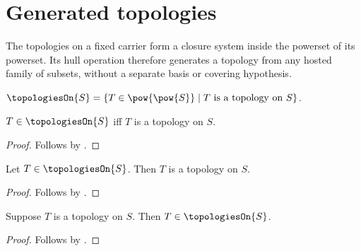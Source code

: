 \section{Generated topologies}




The topologies on a fixed carrier form a closure system inside the powerset
of its powerset.  Its hull operation therefore generates a topology from any
hosted family of subsets, without a separate basis or covering hypothesis.

\begin{definition}\label{topologies_on}
    $\topologiesOn{S}=\{T\in\pow{\pow{S}}\mid
        \text{$T$ is a topology on $S$}\}$.
\end{definition}

\begin{proposition}\label{topologies_on_iff}
    $T\in\topologiesOn{S}$ iff $T$ is a topology on $S$.
\end{proposition}
\begin{proof}
    Follows by
        .
\end{proof}

\begin{classification}\label{topologies_on_member_is_topology}
    Let $T\in\topologiesOn{S}$.
    Then $T$ is a topology on $S$.
\end{classification}
\begin{proof}
    Follows by .
\end{proof}

\begin{proposition}\label{topology_in_topologies_on}
    Suppose $T$ is a topology on $S$.
    Then $T\in\topologiesOn{S}$.
\end{proposition}
\begin{proof}
    Follows by .
\end{proof}

